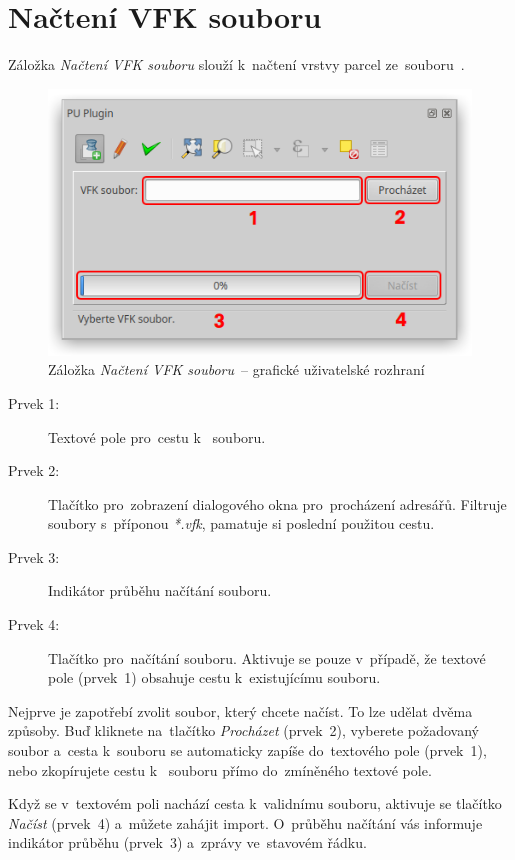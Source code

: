 \newpage

\section{Načtení VFK souboru}
\label{manual_nacteni_vfk}

Záložka \textit{Načtení VFK souboru} slouží k~načtení vrstvy parcel ze~souboru~.

	\begin{figure}[H]
		\centering
		\includegraphics[width=.55\textwidth]{./pictures/nacteni_vfk_gui.png}
		\caption[Záložka \textit{Načtení VFK souboru}~– grafické uživatelské rozhraní]{Záložka \textit{Načtení VFK souboru}~– grafické uživatelské rozhraní}
		\label{fig:manual_nacteni_vfk_gui}
 	\end{figure}

\begin{description}
	\item[Prvek 1:] Textové pole pro~cestu k~ souboru.
	\item[Prvek 2:] Tlačítko pro~zobrazení dialogového okna pro~procházení adresářů. Filtruje soubory s~příponou \textit{*.vfk}, pamatuje si poslední použitou cestu.
	\item[Prvek 3:] Indikátor průběhu načítání  souboru.
	\item[Prvek 4:] Tlačítko pro~načítání  souboru. Aktivuje se pouze v~případě, že textové pole (prvek~1) obsahuje cestu k~existujícímu  souboru.
\end{description}

Nejprve je zapotřebí zvolit  soubor, který chcete načíst. To lze udělat dvěma způsoby. Buď kliknete na~tlačítko \textit{Procházet} (prvek~2), vyberete požadovaný soubor a~cesta k~souboru se automaticky zapíše do~textového pole (prvek~1), nebo zkopírujete cestu k~ souboru přímo do~zmíněného textové pole.

Když se v~textovém poli nachází cesta k~validnímu  souboru, aktivuje se tlačítko \textit{Načíst} (prvek~4) a~můžete zahájit import. O~průběhu načítání vás informuje indikátor průběhu (prvek~3) a~zprávy ve~stavovém řádku.

